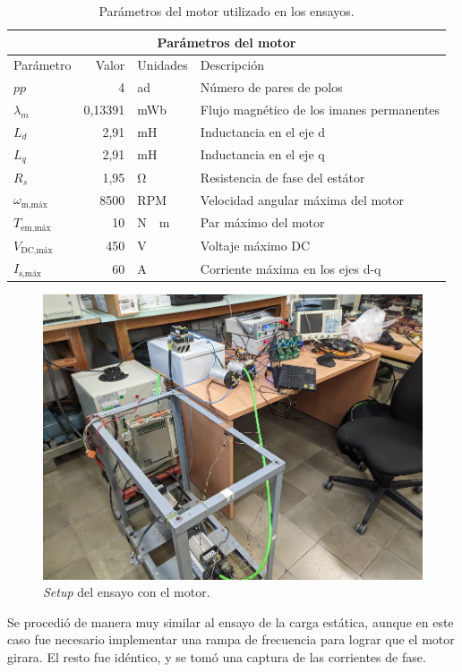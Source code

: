 \begin{table}[H]
	\begin{tabular}{|p{2cm}||r|p{1.5cm}|p{8cm}|}
		\hline
		\multicolumn{4}{|c|}{Parámetros del motor} \\
		\hline
		Parámetro & Valor & Unidades & Descripción \\
		\hline
		\(pp\) & 4 & ad & Número de pares de polos \\
		\(\lambda_m\) & 0,13391 & mWb & Flujo magnético de los imanes permanentes \\
		\(L_d\) & 2,91 & mH & Inductancia en el eje d \\
		\(L_q\) & 2,91 & mH & Inductancia en el eje q \\
		\(R_s\) & 1,95 & \unit{\ohm} & Resistencia de fase del estátor \\
		\(\omega_{\text{m,máx}}\) & 8500 & RPM & Velocidad angular máxima del motor \\
		\(T_{\text{em,máx}}\) & 10 & \unit{N \cdot m} & Par máximo del motor \\
		\(V_{\text{DC,máx}}\) & 450 & \unit{V} & Voltaje máximo DC \\
		\(I_{\text{s,máx}}\) & 60 & \unit{A} & Corriente máxima en los ejes d-q \\
		\hline
	\end{tabular}
	\caption{Parámetros del motor utilizado en los ensayos.}
\end{table}

\begin{figure}[H]
	\centering
	\includegraphics[width=0.7\linewidth]{fig/Mavilor-setup}
	\caption{\textit{Setup} del ensayo con el motor.}
\end{figure}

Se procedió de manera muy similar al ensayo de la carga estática, aunque en este caso fue necesario implementar una rampa de frecuencia para lograr que el motor girara. El resto fue idéntico, y se tomó una captura de las corrientes de fase.


